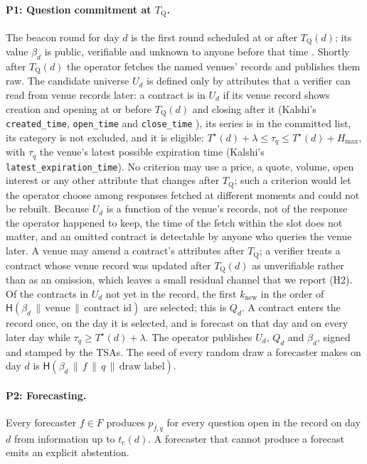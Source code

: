 \documentclass[11pt]{article}
\newcommand{\Hh}{\mathsf{H}}
\newcommand{\Ts}{T^{\star}}
\newcommand{\tQ}{T_{\mathrm{Q}}}
\newcommand{\tc}{t_{\mathrm{c}}}
\begin{document}
\paragraph{P1: Question commitment at $\tQ$.} The beacon round for day $d$ is the first round scheduled at or after $\tQ(d)$; its value $\beta_d$ is public, verifiable and unknown to anyone before that time \citep{drand,nist8213}. Shortly after $\tQ(d)$ the operator fetches the named venues' records and publishes them raw. The candidate universe $U_d$ is defined only by attributes that a verifier can read from venue records later: a contract is in $U_d$ if its venue record shows creation and opening at or before $\tQ(d)$ and closing after it (Kalshi's \texttt{created\_time}, \texttt{open\_time} and \texttt{close\_time} \citep{kalshi_market}), its series is in the committed list, its category is not excluded, and it is eligible: $\Ts(d) + \lambda \le \tau_q \le \Ts(d) + H_{\max}$, with $\tau_q$ the venue's latest possible expiration time (Kalshi's \texttt{latest\_expiration\_time}). No criterion may use a price, a quote, volume, open interest or any other attribute that changes after $\tQ$; such a criterion would let the operator choose among responses fetched at different moments and could not be rebuilt. Because $U_d$ is a function of the venue's records, not of the response the operator happened to keep, the time of the fetch within the slot does not matter, and an omitted contract is detectable by anyone who queries the venue later. A venue may amend a contract's attributes after $\tQ$; a verifier treats a contract whose venue record was updated after $\tQ(d)$ as unverifiable rather than as an omission, which leaves a small residual channel that we report (H2). Of the contracts in $U_d$ not yet in the record, the first $k_{\mathrm{new}}$ in the order of $\Hh(\beta_d \,\|\, \text{venue} \,\|\, \text{contract id})$ are selected; this is $Q_d$. A contract enters the record once, on the day it is selected, and is forecast on that day and on every later day while $\tau_q \ge \Ts(d) + \lambda$. The operator publishes $U_d$, $Q_d$ and $\beta_d$, signed and stamped by the TSAs. The seed of every random draw a forecaster makes on day $d$ is $\Hh(\beta_d \,\|\, f \,\|\, q \,\|\, \text{draw label})$.

\paragraph{P2: Forecasting.} Every forecaster $f \in F$ produces $p_{f,q}$ for every question open in the record on day $d$ from information up to $\tc(d)$. A forecaster that cannot produce a forecast emits an explicit abstention.
\end{document}
